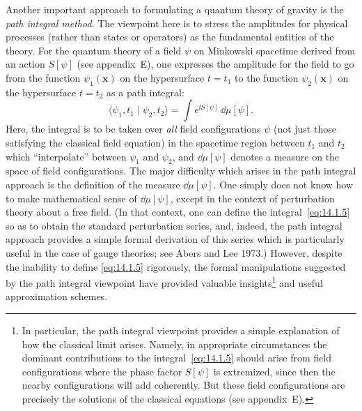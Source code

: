 Another important approach to formulating a quantum theory of gravity is the
\emph{path integral method}. The viewpoint here is to stress the amplitudes for physical
processes (rather than states or operators) as the fundamental entities of the theory.
For the quantum theory of a field \(\psi\) on Minkowski spacetime derived from an
action \(S[\psi]\) (see appendix~E), one expresses the amplitude for the field to go from
the function \(\psi_1(\boldsymbol{x})\) on the hypersurface \(t=t_1\) to the function
\(\psi_2(\boldsymbol{x})\) on the hypersurface \(t=t_2\) as a path integral:
\begin{equation}
  \langle\psi_1,t_1\mid\psi_2,t_2\rangle
  =\int e^{\ii S[\psi]}\,\dd\mu[\psi].
  \tag{14.1.5}\label{eq:14.1.5}
\end{equation}
Here, the integral is to be taken over \emph{all} field configurations \(\psi\) (not just those
satisfying the classical field equation) in the spacetime region between \(t_1\) and \(t_2\)
which ``interpolate'' between \(\psi_1\) and \(\psi_2\), and \(\dd\mu[\psi]\) denotes a measure
on the space of field configurations. The major difficulty which arises in the path
integral approach is the definition of the measure \(\dd\mu[\psi]\). One simply does not know
how to make mathematical sense of \(\dd\mu[\psi]\), except in the context of perturbation
theory about a free field. (In that context, one can define the integral~\eqref{eq:14.1.5}
so as to obtain the standard perturbation series, and, indeed, the path integral approach
provides a simple formal derivation of this series which is particularly useful in the case
of gauge theories; see Abers and Lee 1973.) However, despite the inability to define
\eqref{eq:14.1.5} rigorously, the formal manipulations suggested by the path integral
viewpoint have provided valuable insights\footnote{In particular, the path integral
viewpoint provides a simple explanation of how the classical limit arises. Namely,
in appropriate circumstances the dominant contributions to the integral~\eqref{eq:14.1.5}
should arise from field configurations where the phase factor \(S[\psi]\) is extremized,
since then the nearby configurations will add coherently. But these field configurations
are precisely the solutions of the classical equations (see appendix~E).} and useful
approximation schemes.

